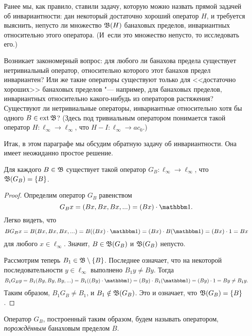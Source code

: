 Ранее мы, как правило, ставили задачу, которую можно назвать прямой задачей об инвариантности:
дан некоторый достаточно хороший оператор $H$, и требуется выяснить, непусто ли множество $\mathfrak{B}(H)$
банаховых пределов, инвариантных относительно этого оператора.
(И~если это множество непусто, то исследовать его.)

Возникает закономерный вопрос: для любого ли банахова предела существует нетривиальный оператор,
относительно которого этот банахов предел инвариантен?
Или же такие операторы существуют только для <<достаточно хороших>>
банаховых пределов "--- например, для банаховых пределов, инвариантных относительно какого-нибудь из операторов растяжения?
Существуют ли нетривиальные операторы, инвариантные относительно хотя бы одного $B\in\operatorname{ext} \mathfrak{B}$?
(Здесь под тривиальным оператором понимается такой оператор $H:\ell_\infty \to \ell_\infty$, что $H-I:\ell_\infty \to ac_0$.)

Итак, в этом параграфе мы обсудим обратную задачу об инвариантности.
Она имеет неожиданно простое решение.

\begin{theorem}
	Для каждого $B\in \mathfrak{B}$ существует такой оператор $G_B:\ell_\infty \to \ell_\infty$,
	что $\mathfrak{B}(G_B) = \{B\}$.
\end{theorem}

\begin{proof}
	Определим оператор $G_B$ равенством
	\begin{equation}
		G_B x = (Bx, Bx, Bx, ...) = (Bx)\cdot\one
		.
	\end{equation}
	Легко видеть, что
	\begin{equation}
		B G_B x = B(Bx, Bx, Bx, ...) = B((Bx)\cdot\one) = (Bx)\cdot B(\one)= (Bx)\cdot 1 = Bx
	\end{equation}
	для любого $x\in\ell_\infty$.
	Значит, $B\in \mathfrak{B} (G_B)$ и $\mathfrak{B} (G_B)$ непусто.

	Рассмотрим теперь $B_1 \in \mathfrak{B} \setminus\{B\}$.
	Последнее означает, что на некоторой последовательности $y\in\ell_\infty$ выполнено $B_1y \ne By$.
	Тогда
	\begin{equation}
		B_1 G_B y = B_1(By, By, By, ...) = B_1((By)\cdot\one) = (By)\cdot B_1(\one)= (By)\cdot 1 = By \ne B_1y
		.
	\end{equation}
	Таким образом, $B_1 G_B \ne B_1$, и $B_1 \notin \mathfrak{B} (G_B)$.
	Это и означает, что $\mathfrak{B}(G_B) = \{B\}$.
\end{proof}

\begin{definition}
	Оператор $G_B$, построенный таким образом, будем называть оператором,
	\emph{порождённым} банаховым пределом $B$.
\end{definition}

